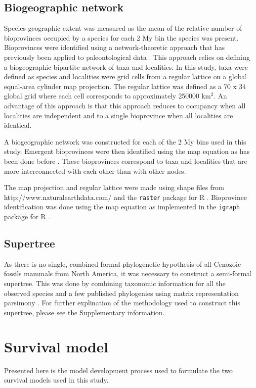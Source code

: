 \documentclass{pnastwo}
\begin{document}
\begin{article}
\begin{materials}
\subsection{Biogeographic network}
Species geographic extent was measured as the mean of the relative number of bioprovinces occupied by a species for each 2 My bin the species was present. Bioprovinces were identified using a network-theoretic approach that has previously been applied to paleontological data \cite{Sidor2013,Vilhena2013}. This approach relies on defining a biogeographic bipartite network of taxa and localities. In this study, taxa were defined as species and localities were grid cells from a regular lattice on a global equal-area cylinder map projection. The regular lattice was defined as a 70 x 34 global grid where each cell corresponds to approximately 250000 km\(^{2}\). An advantage of this approach is that this approach reduces to occupancy when all localities are independent and to a single bioprovince when all localities are identical.

A biogeographic network was constructed for each of the 2 My bins used in this study. Emergent bioprovinces were then identified using the map equation \cite{Rosvall2008,Rosvall2009a} as has been done before \cite{Sidor2013,Vilhena2013b,Vilhena2013}. These bioprovinces correspond to taxa and localities that are more interconnected with each other than with other nodes.

The map projection and regular lattice were made using shape files from http://www.naturalearthdata.com/ and the \texttt{raster} package for R \cite{raster}. Bioprovince identification was done using the map equation as implemented in the \texttt{igraph} package for R \cite{csardi2006igraph}.


\subsection{Supertree}

As there is no single, combined formal phylogenetic hypothesis of all Cenozoic fossils mammals from North America, it was necessary to construct a semi-formal supertree. This was done by combining taxonomic information for all the observed species and a few published phylogenies using matrix representation parsimony \cite{Bininda-Emonds2007}. For further explination of the methodology used to construct this supertree, please see the Supplementary information.


\section{Survival model}
Presented here is the model development process used to formulate the two survival models used in this study. 


\end{materials}
\end{article}
\end{document}
